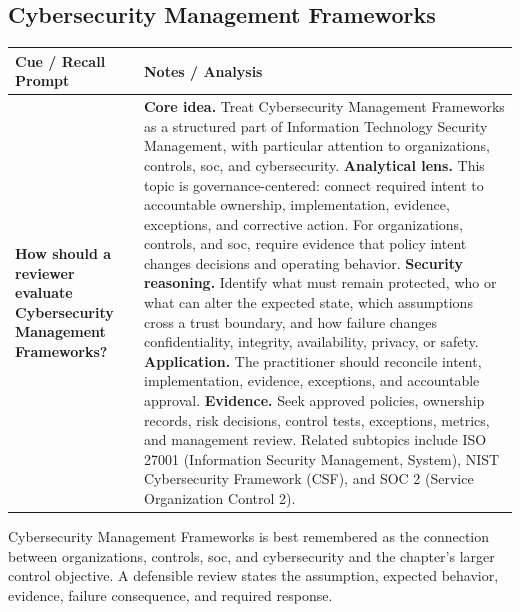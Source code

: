 \documentclass[11pt]{article}
\newcommand{\CornellHeader}{%
\rowcolor{Navy}\color{white}\bfseries Cue / Recall Prompt & \color{white}\bfseries Notes / Analysis\\\hline}
\newcommand{\CornellRow}[2]{%
\cellcolor{CueGray}\RaggedRight\textbf{#1} & \RaggedRight #2\\\hline}
\begin{document}
\subsection*{Cybersecurity Management Frameworks}
\begin{longtable}{>{\RaggedRight\arraybackslash}p{}|>{\RaggedRight\arraybackslash}p{}}
\CornellHeader
\CornellRow{How should a reviewer evaluate Cybersecurity Management Frameworks?}{\textbf{Core idea.} Treat Cybersecurity Management Frameworks as a structured part of Information Technology Security Management, with particular attention to organizations, controls, soc, and cybersecurity. \textbf{Analytical lens.} This topic is governance-centered: connect required intent to accountable ownership, implementation, evidence, exceptions, and corrective action. For organizations, controls, and soc, require evidence that policy intent changes decisions and operating behavior. \textbf{Security reasoning.} Identify what must remain protected, who or what can alter the expected state, which assumptions cross a trust boundary, and how failure changes confidentiality, integrity, availability, privacy, or safety. \textbf{Application.} The practitioner should reconcile intent, implementation, evidence, exceptions, and accountable approval. \textbf{Evidence.} Seek approved policies, ownership records, risk decisions, control tests, exceptions, metrics, and management review. Related subtopics include ISO 27001 (Information Security Management, System), NIST Cybersecurity Framework (CSF), and SOC 2 (Service Organization Control 2).}
\end{longtable}
\begin{topicsummary}
Cybersecurity Management Frameworks is best remembered as the connection between organizations, controls, soc, and cybersecurity and the chapter's larger control objective. A defensible review states the assumption, expected behavior, evidence, failure consequence, and required response.
\end{topicsummary}
\end{document}
